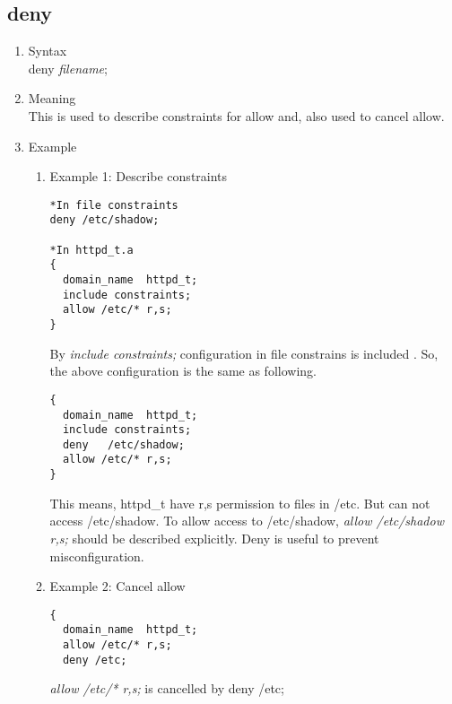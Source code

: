\documentclass{article}
\begin{document}
\begin{enumerate}
 \end{enumerate}

\subsection{deny}
\begin{enumerate}
 \item Syntax\\
 deny {\it filename};
 \item Meaning\\
This is used to describe constraints for allow and, also used to cancel allow.
 \item Example
\begin{enumerate}
 \item Example 1: Describe constraints\\
   \begin{verbatim}
*In file constraints
deny /etc/shadow;

*In httpd_t.a
{
  domain_name  httpd_t;
  include constraints;
  allow /etc/* r,s; 
}
   \end{verbatim}
By {\it include constraints;} configuration in file constrains is
       included .
So, the above configuration is the same as following.
       \begin{verbatim}
{
  domain_name  httpd_t;
  include constraints;
  deny   /etc/shadow;
  allow /etc/* r,s;
}
       \end{verbatim}
This means, httpd\_t have r,s permission to files in /etc. But can not
       access /etc/shadow.
To allow access to /etc/shadow, 
{\it allow /etc/shadow r,s;} should be described explicitly.
Deny is useful to prevent misconfiguration.

 \item Example 2: Cancel allow\\
\begin{verbatim}
{
  domain_name  httpd_t;
  allow /etc/* r,s;
  deny /etc;
\end{verbatim}
{\it allow /etc/* r,s;} is cancelled by deny /etc;

\end{enumerate}
\end{enumerate}
\end{document}
